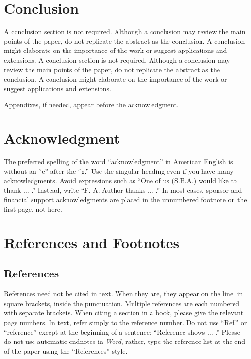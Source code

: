\documentclass[journal,twoside,web]{ieeecolor}
\begin{document}
\section{Conclusion}
A conclusion section is not required. Although a conclusion may review the 
main points of the paper, do not replicate the abstract as the conclusion. A 
conclusion might elaborate on the importance of the work or suggest 
applications and extensions. A conclusion section is not required. Although a conclusion may review the 
main points of the paper, do not replicate the abstract as the conclusion. A 
conclusion might elaborate on the importance of the work or suggest 
applications and extensions. 

\appendices

Appendixes, if needed, appear before the acknowledgment.

\section*{Acknowledgment}

The preferred spelling of the word ``acknowledgment'' in American English is 
without an ``e'' after the ``g.'' Use the singular heading even if you have 
many acknowledgments. Avoid expressions such as ``One of us (S.B.A.) would 
like to thank $\ldots$ .'' Instead, write ``F. A. Author thanks $\ldots$ .'' In most 
cases, sponsor and financial support acknowledgments are placed in the 
unnumbered footnote on the first page, not here.

\section*{References and Footnotes}

\subsection{References}
References need not be cited in text. When they are, they appear on the 
line, in square brackets, inside the punctuation. Multiple references are 
each numbered with separate brackets. When citing a section in a book, 
please give the relevant page numbers. In text, refer simply to the 
reference number. Do not use ``Ref.'' or ``reference'' except at the 
beginning of a sentence: ``Reference \cite{b3} shows $\ldots$ .'' Please do not use 
automatic endnotes in \emph{Word}, rather, type the reference list at the end of the 
paper using the ``References'' style.
\end{document}
